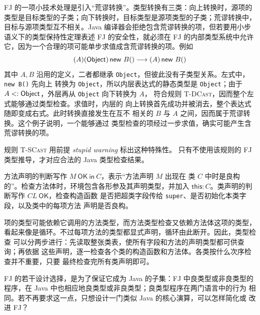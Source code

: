 
FJ 的一项小技术处理是引入“荒谬转换”。类型转换有三类：向上转换时，源项的
类型是目标类型的子类；向下转换时，目标类型是源项类型的子类；荒谬转换中，
目标与源项类型互不相关。Java 编译器会拒绝包含荒谬转换的项，但若要用小步
语义下的类型保持性定理表述 FJ 的安全性，就必须在 FJ 的内部类型系统中允许
它，因为一个合理的项可能单步求值成含荒谬转换的项。例如
\[
(A)(\mathsf{Object})\,\mathsf{new}\ B()
\mathrel{\longrightarrow} (A)\,\mathsf{new}\ B()
\]
其中 \(A,B\) 沿用的定义，二者都继承
\texttt{Object}，但彼此没有子类型关系。左式中，\texttt{new B()} 先向上
转换为 \texttt{Object}，所以内层表达式的静态类型是 \texttt{Object}；由于
\(A\mathrel{<:}\mathsf{Object}\)，外层再从 \texttt{Object} 向下转换为 \(A\)，
符合规则 \textsc{T-DCast}，因而整个左式能够通过类型检查。求值时，内层的
向上转换首先成功并被消去，整个表达式随即变成右式。此时转换直接发生在互不
相关的 \(B\) 与 \(A\) 之间，因而属于荒谬转换。这个例子说明，一个能够通过
类型检查的项经过一步求值，确实可能产生含荒谬转换的项。

规则 \textsc{T-SCast} 用前提 \textit{stupid warning} 标出这种特殊性。
只有不使用该规则的 FJ 类型推导，才对应合法的 Java 类型检查结果。

方法声明的判断写作 \(M\ \mathsf{OK\ in}\ C\)，表示“方法声明 \(M\) 出现在
类 \(C\) 中时是良构的”。检查方法体时，环境包含各形参及其声明类型，并加入
\(\mathsf{this}:C\)。类声明的判断写作 \(CL\ \mathsf{OK}\)，检查构造函数
是否把超类字段传给 \texttt{super}、是否初始化本类字段，以及类中的每项方法
声明是否良构。

项的类型可能依赖它调用的方法类型，而方法类型检查又依赖方法体这项的类型，
看起来像是循环。不过每项方法的类型都显式声明，循环由此断开。因此，类型检查
可以分两步进行：先读取整张类表，使所有字段和方法的声明类型都可供查询；再依据
这些声明，逐一检查各个类的构造函数和方法体。各类按什么次序检查并不重要，只要
最终检查完所有类声明即可。

\begin{exercise}[\(\star\star\)]
\label{ex:19.4.2}
FJ 的若干设计选择，是为了保证它成为 Java 的子集：FJ 中良类型或非良类型的
程序，在 Java 中也相应地良类型或非良类型；良类型程序在两门语言中的行为
相同。若不再要求这一点，只想设计一门类似 Java 的核心演算，可以怎样简化或
改进 FJ？
\end{exercise}

